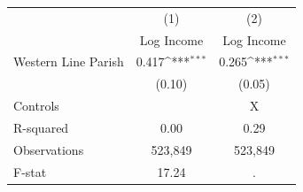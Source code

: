 {
\def\sym#1{\ifmmode^{#1}\else\(^{#1}\)\fi}
\begin{tabular}{l*{2}{c}}
\hline\hline
                    &\multicolumn{1}{c}{(1)}&\multicolumn{1}{c}{(2)}\\
                    &\multicolumn{1}{c}{Log Income}&\multicolumn{1}{c}{Log Income}\\
\hline
Western Line Parish &       0.417\sym{***}&       0.265\sym{***}\\
                    &      (0.10)         &      (0.05)         \\
\hline
Controls            &                     &           X         \\
R-squared           &        0.00         &        0.29         \\
Observations        &     523,849         &     523,849         \\
F-stat              &       17.24         &           .         \\
\hline\hline
\end{tabular}
}
